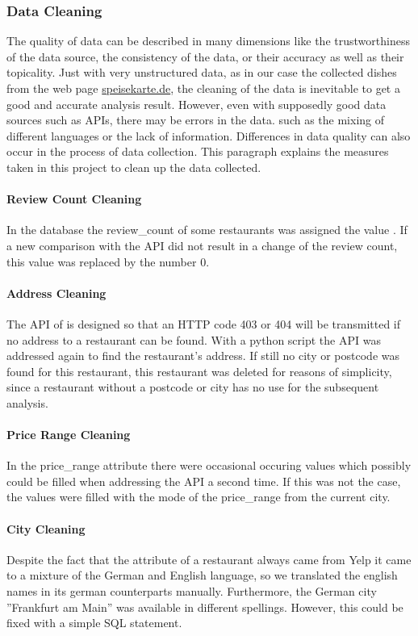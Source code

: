 \subsubsection{Data Cleaning}
\label{subsubsec:cleaning}
The quality of data can be described in many dimensions like \eg{} the trustworthiness of the data source, the consistency of the data,
or their accuracy as well as their topicality.
Just with very unstructured data, as in our case the collected dishes from the web page \url{speisekarte.de}, the cleaning of the data is
inevitable to get a good and accurate analysis result.
However, even with supposedly good data sources such as \acp{API}, there may be errors in the data.
such as \eg{} the mixing of different languages or the lack of information.
Differences in data quality can also occur in the process of data collection.
\newline
This paragraph explains the measures taken in this project to clean up the data collected.
\paragraph{Review Count Cleaning}
In the \pg{} database the review\_count of some restaurants was assigned the value .
If a new comparison with the \ylp{} \ac{API} did not result in a change of the review count,
this  value was replaced by the number 0.
\paragraph{Address Cleaning}
The \ac{API} of \ylp{} is designed so that an HTTP code 403 or 404 will be transmitted if no address to a restaurant
can be found.
With a python script the \ylp{} \ac{API} was addressed again to find the restaurant's address.
If still no city or postcode was found for this restaurant, this restaurant was deleted for reasons of simplicity,
since a restaurant without a postcode or city has no use for the subsequent analysis.
\paragraph{Price Range Cleaning}
In the price\_range attribute there were occasional occuring  values which possibly could be filled when addressing the \ylp{} \ac{API} a second time.
If this was not the case, the  values were filled with the mode of the price\_range from the current city.
\paragraph{City Cleaning}
Despite the fact that the  attribute of a restaurant always came from Yelp it came to a mixture of the German and English language,
so we translated the english names in its german counterparts manually.
Furthermore, the German city ''Frankfurt am Main'' was available in different spellings.
However, this could be fixed with a simple \ac{SQL} statement.
